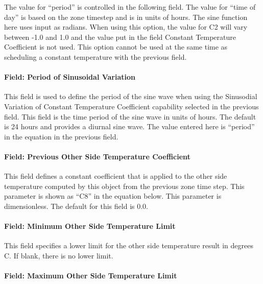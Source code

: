 The value for ``period'' is controlled in the following field. The value for ``time of day'' is based on the zone timestep and is in units of hours. The sine function here uses input as radians. When using this option, the value for C2 will vary between -1.0 and 1.0 and the value put in the field Constant Temperature Coefficient is not used. This option cannot be used at the same time as scheduling a constant temperature with the previous field.

\paragraph{Field: Period of Sinusoidal Variation}\label{field-period-of-sinusoidal-variation}

This field is used to define the period of the sine wave when using the Sinusodial Variation of Constant Temperature Coefficient capability selected in the previous field. This field is the time period of the sine wave in units of hours. The default is 24 hours and provides a diurnal sine wave. The value entered here is ``period'' in the equation in the previous field.

\paragraph{Field: Previous Other Side Temperature Coefficient}\label{field-previous-other-side-temperature-coefficient}

This field defines a constant coefficient that is applied to the other side temperature computed by this object from the previous zone time step. This parameter is shown as ``C8'' in the equation below. This parameter is dimensionless. The default for this field is 0.0.

\paragraph{Field: Minimum Other Side Temperature Limit}\label{field-minimum-other-side-temperature-limit}

This field specifies a lower limit for the other side temperature result in degrees C. If blank, there is no lower limit.

\paragraph{Field: Maximum Other Side Temperature Limit}\label{field-maximum-other-side-temperature-limit}

